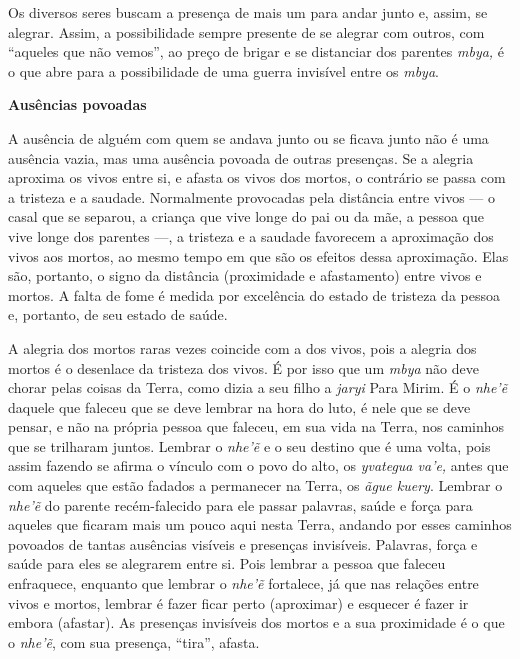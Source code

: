 Os diversos seres buscam a presença de mais um para andar junto e,
assim, se alegrar. Assim, a possibilidade sempre presente de se alegrar
com outros, com ``aqueles que não vemos'', ao preço de brigar e se
distanciar dos parentes \emph{mbya,} é o que abre para a possibilidade
de uma guerra invisível entre os \emph{mbya}.

\textbf{Ausências povoadas}

\protect\hypertarget{OLE_LINK11}{}{\protect\hypertarget{OLE_LINK10}{}{}}A
ausência de alguém com quem se andava junto ou se ficava junto não é uma
ausência vazia, mas uma ausência povoada de outras presenças. Se a
alegria aproxima os vivos entre si, e afasta os vivos dos mortos, o
contrário se passa com a tristeza e a saudade. Normalmente provocadas
pela distância entre vivos --- o casal que se separou, a criança que
vive longe do pai ou da mãe, a pessoa que vive longe dos parentes ---, a
tristeza e a saudade favorecem a aproximação dos vivos aos mortos, ao
mesmo tempo em que são os efeitos dessa aproximação. Elas são, portanto,
o signo da distância (proximidade e afastamento) entre vivos e mortos. A
falta de fome é medida por excelência do estado de tristeza da pessoa e,
portanto, de seu estado de saúde.

A alegria dos mortos raras vezes coincide com a dos vivos, pois a
alegria dos mortos é o desenlace da tristeza dos vivos. É por isso que
um \emph{mbya} não deve chorar pelas coisas da Terra, como dizia a seu
filho a \emph{jaryi} Para Mirim. É o \emph{nhe'ẽ} daquele que faleceu
que se deve lembrar na hora do luto, é nele que se deve pensar, e não na
própria pessoa que faleceu, em sua vida na Terra, nos caminhos que se
trilharam juntos. Lembrar o \emph{nhe'ẽ} e o seu destino que é uma
volta, pois assim fazendo se afirma o vínculo com o povo do alto, os
\emph{yvategua va'e,} antes que com aqueles que estão fadados a
permanecer na Terra, os \emph{ãgue kuery}. Lembrar o \emph{nhe'ẽ} do
parente recém-falecido para ele passar palavras, saúde e força para
aqueles que ficaram mais um pouco aqui nesta Terra, andando por esses
caminhos povoados de tantas ausências visíveis e presenças invisíveis.
Palavras, força e saúde para eles se alegrarem entre si. Pois lembrar a
pessoa que faleceu enfraquece, enquanto que lembrar o \emph{nhe'ẽ}
fortalece, já que nas relações entre vivos e mortos, lembrar é fazer
ficar perto (aproximar) e esquecer é fazer ir embora (afastar). As
presenças invisíveis dos mortos e a sua proximidade é o que o
\emph{nhe'ẽ}, com sua presença, ``tira'', afasta.


